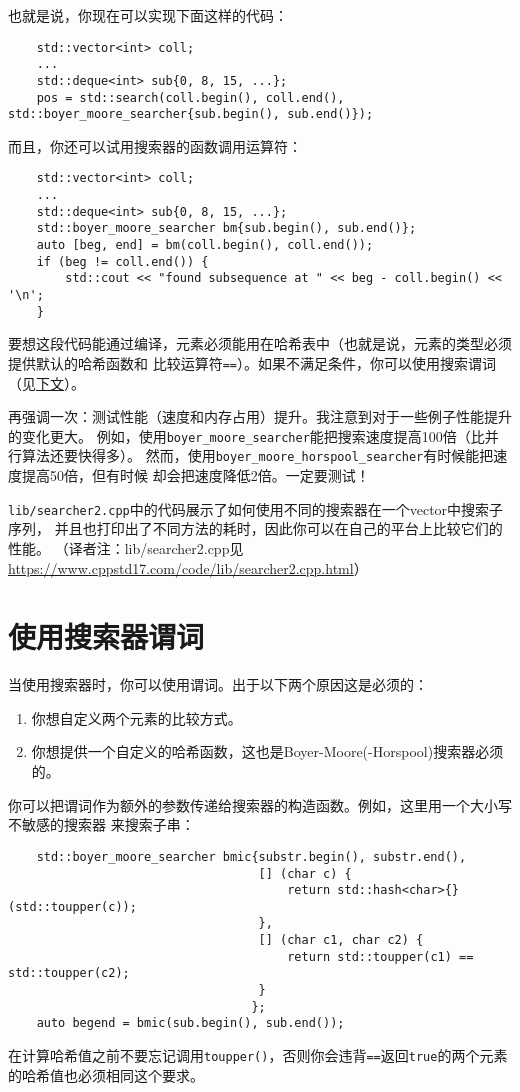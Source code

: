 也就是说，你现在可以实现下面这样的代码：
\begin{lstlisting}
    std::vector<int> coll;
    ...
    std::deque<int> sub{0, 8, 15, ...};
    pos = std::search(coll.begin(), coll.end(), std::boyer_moore_searcher{sub.begin(), sub.end()});
\end{lstlisting}
而且，你还可以试用搜索器的函数调用运算符：
\begin{lstlisting}
    std::vector<int> coll;
    ...
    std::deque<int> sub{0, 8, 15, ...};
    std::boyer_moore_searcher bm{sub.begin(), sub.end()};
    auto [beg, end] = bm(coll.begin(), coll.end());
    if (beg != coll.end()) {
        std::cout << "found subsequence at " << beg - coll.begin() << '\n';
    }
\end{lstlisting}
要想这段代码能通过编译，元素必须能用在哈希表中（也就是说，元素的类型必须提供默认的哈希函数和
比较运算符\texttt{==}）。如果不满足条件，你可以使用搜索谓词（见\hyperref[ch24.3]{下文}）。

再强调一次：测试性能（速度和内存占用）提升。我注意到对于一些例子性能提升的变化更大。
例如，使用\texttt{boyer\_moore\_searcher}能把搜索速度提高100倍（比并行算法还要快得多）。
然而，使用\texttt{boyer\_moore\_horspool\_searcher}有时候能把速度提高50倍，但有时候
却会把速度降低2倍。一定要测试！

\texttt{lib/searcher2.cpp}中的代码展示了如何使用不同的搜索器在一个vector中搜索子序列，
并且也打印出了不同方法的耗时，因此你可以在自己的平台上比较它们的性能。
（译者注：lib/searcher2.cpp见\url{https://www.cppstd17.com/code/lib/searcher2.cpp.html}）

\section{使用搜索器谓词}\label{ch24.3}
当使用搜索器时，你可以使用谓词。出于以下两个原因这是必须的：
\begin{enumerate}
    \item 你想自定义两个元素的比较方式。
    \item 你想提供一个自定义的哈希函数，这也是Boyer-Moore(-Horspool)搜索器必须的。
\end{enumerate}
你可以把谓词作为额外的参数传递给搜索器的构造函数。例如，这里用一个大小写不敏感的搜索器
来搜索子串：
\begin{lstlisting}
    std::boyer_moore_searcher bmic{substr.begin(), substr.end(),
                                   [] (char c) {
                                       return std::hash<char>{}(std::toupper(c));
                                   },
                                   [] (char c1, char c2) {
                                       return std::toupper(c1) == std::toupper(c2);
                                   }
                                  };
    auto begend = bmic(sub.begin(), sub.end());
\end{lstlisting}
在计算哈希值之前不要忘记调用\texttt{toupper()}，否则你会违背\texttt{==}返回\texttt{true}的两个元素
的哈希值也必须相同这个要求。

